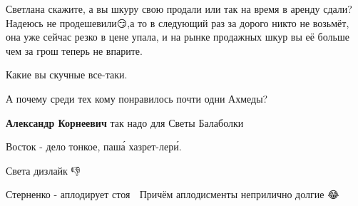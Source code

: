 \begin{itemize}
Светлана скажите, а вы шкуру свою продали или так на время в аренду сдали?
Надеюсь не продешевили😏,а то в следующий раз за дорого никто не возьмёт, она
уже сейчас резко в цене упала, и на рынке продажных шкур вы её больше чем за
грош теперь не впарите.


 
Какие вы скучные все-таки.

 
А почему среди тех кому понравилось почти одни Ахмеды?

\begin{itemize}
 
\textbf{Александр Корнеевич} так надо для Светы Балаболки \Laughey[1.0][white]

 
Восток - дело тонкое, паша́ хазрет-лери́.
\end{itemize}

 
Света дизлайк 👎

 
Стерненко - аплодирует стоя 👏 Причём аплодисменты неприлично долгие 😂

 

\end{itemize}
